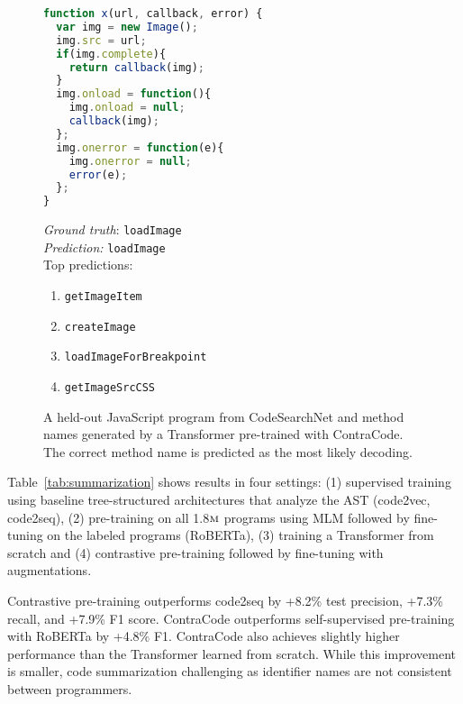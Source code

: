 \documentclass[11pt]{article}
\newcommand{\million}[0]{$\textsc{m}$}
\newcommand{\ours}[0]{ContraCode}
\begin{document}
\begin{figure}
\begin{minipage}{0.5\linewidth}
\begin{footnotesize}
\begin{lstlisting}[language=JavaScript,basicstyle=\ttfamily\tiny]
function x(url, callback, error) {
  var img = new Image();
  img.src = url;
  if(img.complete){
    return callback(img);
  }
  img.onload = function(){
    img.onload = null;
    callback(img);
  };
  img.onerror = function(e){
    img.onerror = null;
    error(e);
  };
}	
\end{lstlisting}
\end{footnotesize}
\end{minipage}\hfill \begin{minipage}{0.5\linewidth}
\begin{small}
\textit{Ground truth}: \texttt{loadImage}\\
\textit{Prediction:} {\color{ForestGreen} \texttt{loadImage} }\\

Top predictions:
{\tiny
\begin{enumerate}
    \item \texttt{getImageItem}
    \item \texttt{createImage}
    \item \texttt{loadImageForBreakpoint}
    \item \texttt{getImageSrcCSS}
\end{enumerate}
}
\end{small}
\end{minipage}
\caption{A held-out JavaScript program from CodeSearchNet and method names generated by a Transformer pre-trained with \ours{}. The correct method name is predicted as the most likely decoding.}
\label{fig:qual_method_name}
\end{figure} 
Table~\ref{tab:summarization} shows results in four settings: (1) supervised training using baseline tree-structured architectures that analyze the AST (code2vec, code2seq), (2) pre-training on all 1.8\million{} programs using MLM followed by fine-tuning on the labeled programs (RoBERTa), (3) training a Transformer from scratch and (4) contrastive pre-training followed by fine-tuning with augmentations.

Contrastive pre-training outperforms code2seq by +8.2\% test precision, +7.3\% recall, and +7.9\% F1 score.
\ours{} outperforms self-supervised pre-training with RoBERTa by +4.8\% F1.
\ours{} also achieves slightly higher performance than the Transformer learned from scratch. While this improvement is smaller, code summarization challenging as identifier names are not consistent between programmers.
\end{document}
